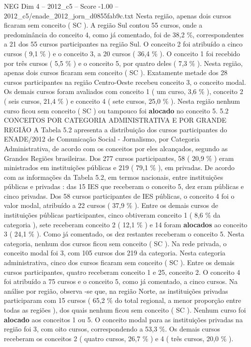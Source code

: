 \begin{textsample}{NEG Dim 4 – 2012\_c5 – Score -1.00 – 2012\_c5/enade\_2012\_jorn\_d0855fab9c.txt}
Nesta região, apenas dois cursos ficaram sem conceito ( SC ).
A região Sul contou 55 cursos, onde a predominância do conceito 4, como já comentado, foi de 38,2 \%, correspondentes a 21 dos 55 cursos participantes na região Sul.
O conceito 2 foi atribuído a cinco cursos ( 9,1 \% ) e o conceito 3, a 20 cursos ( 36,4 \% ).
O conceito 1 foi recebido por três cursos ( 5,5 \% ) e o conceito 5, por quatro deles ( 7,3 \% ).
Nesta região, apenas dois cursos ficaram sem conceito ( SC ).
Exatamente metade dos 28 cursos participantes na região Centro-Oeste recebeu conceito 3, o conceito modal.
Os demais cursos foram avaliados com conceito 1 ( um curso, 3,6 \% ), conceito 2 ( seis cursos, 21,4 \% ) e conceito 4 ( sete cursos, 25,0 \% ).
Nesta região nenhum curso ficou sem conceito ( SC ) ou tampouco foi \textbf{alocado} no conceito 5. 5.2 CONCEITOS POR CATEGORIA ADMINISTRATIVA E POR GRANDE REGIÃO A Tabela 5.2 apresenta a distribuição dos cursos participantes do ENADE/2012 de Comunicação Social - Jornalismo, por Categoria Administrativa, de acordo com os conceitos por eles alcançados, segundo as Grandes Regiões brasileiras.
Dos 277 cursos participantes, 58 ( 20,9 \% ) eram ministrados em instituições públicas e 219 ( 79,1 \% ), em privadas.
De acordo com as informações da Tabela 5.2, em termos nacionais, entre instituições públicas e privadas : das 15 IES que receberam o conceito 5, dez eram públicas e cinco privadas.
Dos 58 cursos participantes de IES públicas, o conceito 4 foi o valor modal, atribuído a 22 cursos ( 37,9 \% ).
Entre os demais cursos de instituições públicas participantes, cinco obtiveram conceito 1 ( 8,6 \% da categoria ), sete receberam conceito 2 ( 12,1 \% ) e 14 foram \textbf{alocados} ao conceito 3 ( 24,1 \% ).
Como já comentado, os dez restantes receberam o conceito 5.
Nesta categoria, nenhum dos cursos ficou sem conceito ( SC ).
Na rede privada, o conceito modal foi 3, com 105 cursos dos 219 da categoria.
Nesta categoria administrativa, cinco dos cursos ficaram sem conceito ( SC ).
Entre os demais cursos participantes, quatro receberam conceito 1 e 25, conceito 2.
O conceito 4 foi atribuído a 75 cursos e o conceito 5, como já comentado, a cinco cursos.
Na análise por região, observa -se que, na região Norte, as instituições privadas participaram com 15 cursos ( 65,2 \% do total regional, a menor proporção entre todas as regiões ), dos quais nenhum ficou sem conceito ( SC ).
Nenhum curso foi \textbf{alocado} aos conceitos 1 ou 5.
O conceito modal para as instituições privadas na região foi 3, com oito cursos, correspondendo a 53,3 \%.
Os demais cursos receberam os conceitos 2 ( quatro cursos, 26,7 \% ) e 4 ( três cursos, 20,0 \% ).

\end{textsample}
